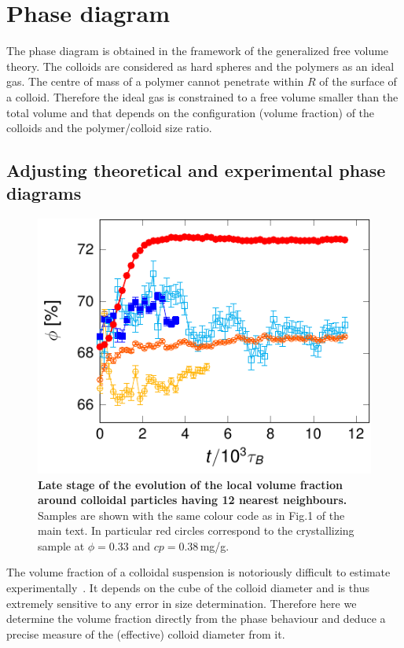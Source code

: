 \section*{Phase diagram}

The phase diagram is obtained in the framework of the generalized free volume theory. The colloids are considered as hard spheres and the polymers as an ideal gas. The centre of mass of a polymer cannot penetrate within $R$ of the surface of a colloid. Therefore the ideal gas is constrained to a free volume smaller than the total volume and that depends on the configuration (volume fraction) of the colloids and the polymer/colloid size ratio.

\subsection*{Adjusting theoretical and experimental phase diagrams}

\begin{figure}
\includegraphics{local_phi12.pdf}%
\caption{{\bf Late stage of the evolution of the local volume fraction around colloidal particles having 12 nearest neighbours.} Samples are shown with the same colour code as in Fig.1 of the main text. In particular red circles correspond to the crystallizing sample at $\phi=0.33$ and $cp=0.38\,$mg/g.}%
\label{fig:local_phi12}%
\end{figure}

The volume fraction of a colloidal suspension is notoriously difficult to estimate experimentally~\cite{Poon2012}. It depends on the cube of the colloid diameter and is thus extremely sensitive to any error in size determination. Therefore here we determine the volume fraction directly from the phase behaviour and deduce a precise measure of the (effective) colloid diameter from it.

